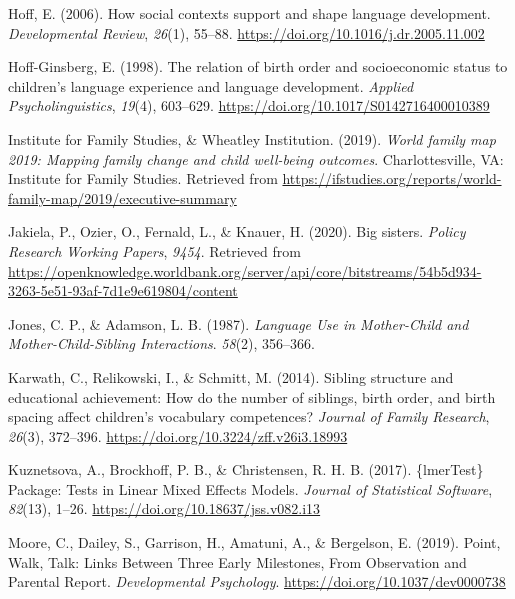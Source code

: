 \documentclass[
  man,mask,floatsintext]{apa6}
\newlength{\cslhangindent}
\newlength{\cslentryspacingunit} %
\newenvironment{CSLReferences}[2] %
 {%
  \setlength{\parindent}{0pt}
  \ifodd #1
  \let\oldpar\par
  \def\par{\hangindent=\cslhangindent\oldpar}
  \fi
  \setlength{\parskip}{#2\cslentryspacingunit}
 }%
 {}
\begin{document}
\begin{CSLReferences}{1}{0}
\leavevmode{}%
Hoff, E. (2006). How social contexts support and shape language development. \emph{Developmental Review}, \emph{26}(1), 55--88. \url{https://doi.org/10.1016/j.dr.2005.11.002}

\leavevmode{}%
Hoff-Ginsberg, E. (1998). The relation of birth order and socioeconomic status to children's language experience and language development. \emph{Applied Psycholinguistics}, \emph{19}(4), 603--629. \url{https://doi.org/10.1017/S0142716400010389}

\leavevmode{}%
Institute for Family Studies, \& Wheatley Institution. (2019). \emph{World family map 2019: {Mapping} family change and child well-being outcomes}. Charlottesville, VA: Institute for Family Studies. Retrieved from \url{https://ifstudies.org/reports/world-family-map/2019/executive-summary}

\leavevmode{}%
Jakiela, P., Ozier, O., Fernald, L., \& Knauer, H. (2020). Big sisters. \emph{Policy Research Working Papers}, \emph{9454}. Retrieved from \url{https://openknowledge.worldbank.org/server/api/core/bitstreams/54b5d934-3263-5e51-93af-7d1e9e619804/content}

\leavevmode{}%
Jones, C. P., \& Adamson, L. B. (1987). \emph{Language {Use} in {Mother}-{Child} and {Mother}-{Child}-{Sibling} {Interactions}}. \emph{58}(2), 356--366.

\leavevmode{}%
Karwath, C., Relikowski, I., \& Schmitt, M. (2014). Sibling structure and educational achievement: How do the number of siblings, birth order, and birth spacing affect children's vocabulary competences? \emph{Journal of Family Research}, \emph{26}(3), 372--396. \url{https://doi.org/10.3224/zff.v26i3.18993}

\leavevmode{}%
Kuznetsova, A., Brockhoff, P. B., \& Christensen, R. H. B. (2017). \{{lmerTest}\} {Package}: {Tests} in {Linear} {Mixed} {Effects} {Models}. \emph{Journal of Statistical Software}, \emph{82}(13), 1--26. \url{https://doi.org/10.18637/jss.v082.i13}

\leavevmode{}%
Moore, C., Dailey, S., Garrison, H., Amatuni, A., \& Bergelson, E. (2019). Point, {Walk}, {Talk}: {Links} {Between} {Three} {Early} {Milestones}, {From} {Observation} and {Parental} {Report}. \emph{Developmental Psychology}. \url{https://doi.org/10.1037/dev0000738}


\end{CSLReferences}
\end{document}
